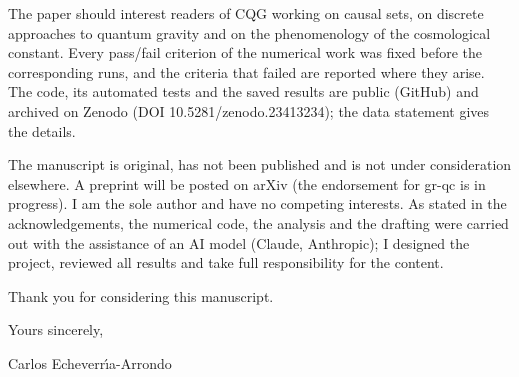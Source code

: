 \documentclass[11pt,a4paper]{article}
\begin{document}
The paper should interest readers of CQG working on causal sets, on discrete
approaches to quantum gravity and on the phenomenology of the cosmological
constant. Every pass/fail criterion of the numerical work was fixed before
the corresponding runs, and the criteria that failed are reported where they
arise. The code, its automated tests and the saved results are public
(GitHub) and archived on Zenodo (DOI 10.5281/zenodo.23413234); the data
statement gives the details.

The manuscript is original, has not been published and is not under
consideration elsewhere. A preprint will be posted on arXiv (the
endorsement for gr-qc is in progress). I am the sole author and have no competing interests. As stated
in the acknowledgements, the numerical code, the analysis and the drafting
were carried out with the assistance of an AI model (Claude, Anthropic); I
designed the project, reviewed all results and take full responsibility for
the content.

Thank you for considering this manuscript.

\vspace{1.5em}
\noindent Yours sincerely,

\vspace{2.5em}
\noindent Carlos Echeverr\'{\i}a-Arrondo
\end{document}
